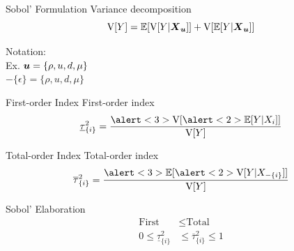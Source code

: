 \documentclass[14pt]{beamer}
\begin{document}
\begin{frame}{Sobol' Formulation}
  Variance decomposition
  \begin{equation*}
    \mathrm{V}[Y] = \mathbb{E}[\mathrm{V}[Y|\boldsymbol{X}_{\boldsymbol{u}}]] + \mathrm{V}[\mathbb{E}[Y|\boldsymbol{X}_{\boldsymbol{u}}]]
  \end{equation*}

  Notation: \\
  Ex. $\boldsymbol{u} = \{\rho,u,d,\mu\}$ \\
  $-\{\epsilon\} = \{\rho,u,d,\mu\}$
\end{frame}

\begin{frame}{First-order Index}
   First-order index
  \begin{equation*}
    \underline{\tau}_{\{i\}}^2 = \frac{\alert<3>{\V[\alert<2>{\E[Y|X_i]}]}}{\V[Y]}
  \end{equation*}

\end{frame}

\begin{frame}{Total-order Index}
  Total-order index
  \begin{equation*}
    \overline{\tau}_{\{i\}}^2 = \frac{\alert<3>{\E[\alert<2>{\V[Y|X_{-\{i\}}]}]}}{\V[Y]}
  \end{equation*}

\end{frame}

\begin{frame}{Sobol' Elaboration}
  \begin{equation*} \begin{aligned}
      \text{First} &\leq \text{Total} \\
      0 \leq \underline{\tau}_{\{i\}}^2 &\leq \overline{\tau}_{\{i\}}^2 \leq 1
  \end{aligned} \end{equation*}
\end{frame}
\end{document}
